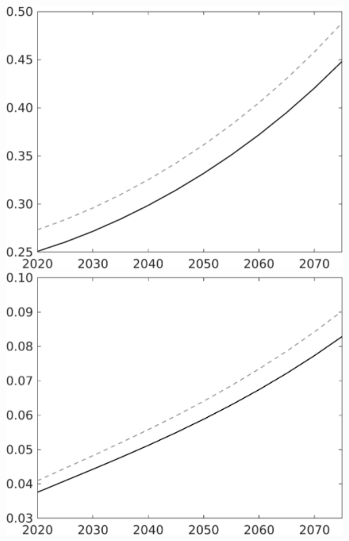 \documentclass[12pt]{article}
\begin{document}
\begin{figure}[h!!]
\begin{minipage}[]{0.32\textwidth}
	\end{minipage}	
	\begin{minipage}[]{0.32\textwidth}
		\includegraphics[width=1\textwidth]{../../codding_model/own_basedOnFried/optimalPol_010922_revision/figures/all_13Sept22/CompTaul_LFBAU_Reg0_F_spillover0_nsk1_xgr1_knspil0_sep1_countec0_GovRev0_etaa0.79_lgd0.png}
	\end{minipage}	
	\begin{minipage}[]{0.32\textwidth}
		\includegraphics[width=1\textwidth]{../../codding_model/own_basedOnFried/optimalPol_010922_revision/figures/all_13Sept22/CompTaul_LFBAU_Reg0_G_spillover0_nsk1_xgr1_knspil0_sep1_countec0_GovRev0_etaa0.79_lgd0.png}

\end{minipage}
\end{figure}
\end{document}
